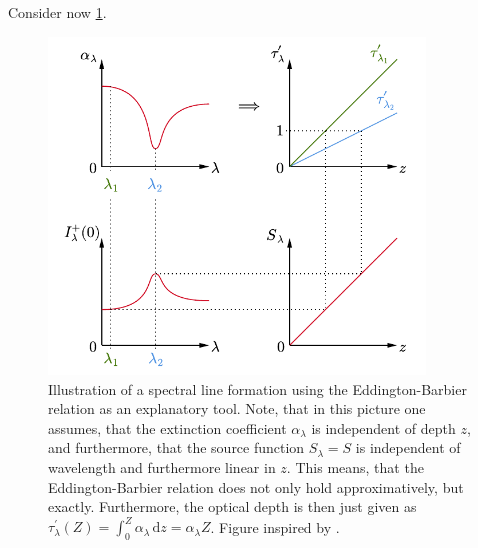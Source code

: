 \documentclass[a4paper,12pt]{report}
\begin{document}
Consider now \cref{fig:spectrallineformation}.
\begin{figure}[h]
\centering
\includegraphics[width=10cm]{figures/spectrallineformation.pdf}
\caption{Illustration of a spectral line formation using the Eddington-Barbier relation as an explanatory tool. Note, that in this picture one assumes, that the extinction coefficient $\alpha_\lambda$ is independent of depth $z$, and furthermore, that the source function $S_\lambda = S$ is independent of wavelength and furthermore linear in $z$. This means, that the Eddington-Barbier relation does not only hold approximatively, but exactly. Furthermore, the optical depth is then just given as $\tau_\lambda^\prime(Z) = \int_{0}^{Z}\alpha_\lambda\,\mathrm{d}z = \alpha_\lambda Z$. Figure inspired by \cite[p.38]{Rutten.2015}.}
\label{fig:spectrallineformation}
\end{figure}
\end{document}
